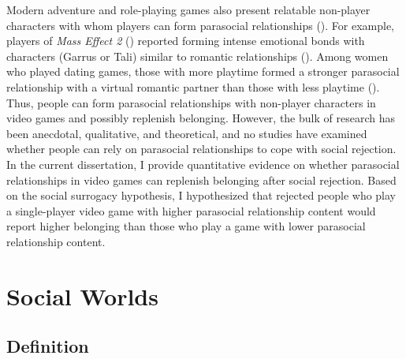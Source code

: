 \documentclass[
]{udthesis}
\begin{document}
Modern adventure and role-playing games also present relatable
non-player characters with whom players can form parasocial
relationships (). For example, players of \emph{Mass Effect 2}
() reported forming intense emotional bonds with characters
(Garrus or Tali) similar to romantic relationships ().
Among women who played dating games, those with more playtime formed a
stronger parasocial relationship with a virtual romantic partner than
those with less playtime (). Thus, people can form parasocial
relationships with non-player characters in video games and possibly
replenish belonging. However, the bulk of research has been anecdotal,
qualitative, and theoretical, and no studies have examined whether
people can rely on parasocial relationships to cope with social
rejection. In the current dissertation, I provide quantitative evidence
on whether parasocial relationships in video games can replenish
belonging after social rejection. Based on the social surrogacy
hypothesis, I hypothesized that rejected people who play a single-player
video game with higher parasocial relationship content would report
higher belonging than those who play a game with lower parasocial
relationship content.

\section{Social Worlds}\label{social-worlds}

\subsection{Definition}\label{definition-1}
\end{document}

